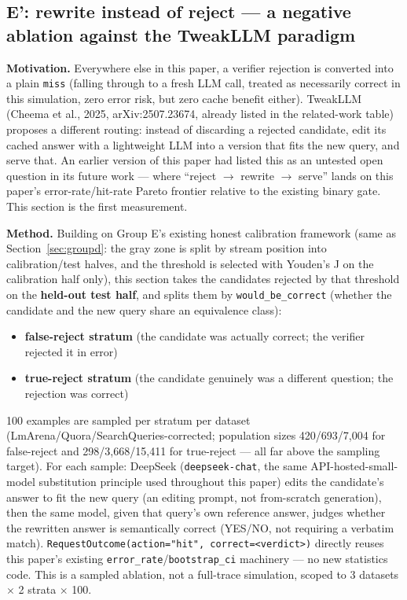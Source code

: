 \documentclass[11pt]{article}
\begin{document}
\subsection{E': rewrite instead of reject --- a negative ablation against the TweakLLM paradigm}
\label{sec:rewrite}

\textbf{Motivation.} Everywhere else in this paper, a verifier rejection is converted into a plain \texttt{miss} (falling through to a fresh LLM call, treated as necessarily correct in this simulation, zero error risk, but zero cache benefit either). TweakLLM (Cheema et al., 2025, arXiv:2507.23674, already listed in the related-work table) proposes a different routing: instead of discarding a rejected candidate, edit its cached answer with a lightweight LLM into a version that fits the new query, and serve that. An earlier version of this paper had listed this as an untested open question in its future work --- where ``reject $\to$ rewrite $\to$ serve'' lands on this paper's error-rate/hit-rate Pareto frontier relative to the existing binary gate. This section is the first measurement.

\textbf{Method.} Building on Group E's existing honest calibration framework (same as Section~\ref{sec:groupd}: the gray zone is split by stream position into calibration/test halves, and the threshold is selected with Youden's J on the calibration half only), this section takes the candidates rejected by that threshold on the \textbf{held-out test half}, and splits them by \texttt{would\_\allowbreak{}be\_\allowbreak{}correct} (whether the candidate and the new query share an equivalence class):

\begin{itemize}
\item \textbf{false-reject stratum} (the candidate was actually correct; the verifier rejected it in error)
\item \textbf{true-reject stratum} (the candidate genuinely was a different question; the rejection was correct)
\end{itemize}

100 examples are sampled per stratum per dataset (LmArena/Quora/SearchQueries-corrected; population sizes 420/693/7{,}004 for false-reject and 298/3{,}668/15{,}411 for true-reject --- all far above the sampling target). For each sample: DeepSeek (\texttt{deepseek-chat}, the same API-hosted-small-model substitution principle used throughout this paper) edits the candidate's answer to fit the new query (an editing prompt, not from-scratch generation), then the same model, given that query's own reference answer, judges whether the rewritten answer is semantically correct (YES/NO, not requiring a verbatim match). \texttt{Request\allowbreak{}Outcome(action="hit", correct=<verdict>)} directly reuses this paper's existing \texttt{error\_\allowbreak{}rate}/\texttt{bootstrap\_\allowbreak{}ci} machinery --- no new statistics code. This is a sampled ablation, not a full-trace simulation, scoped to 3 datasets $\times$ 2 strata $\times$ 100.
\end{document}
